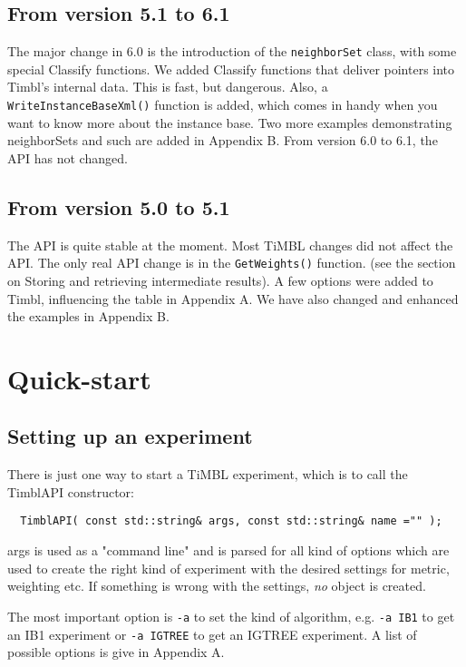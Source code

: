 \documentclass{report}
\begin{document}
\section{From version 5.1 to 6.1}

The major change in 6.0 is the introduction of the {\tt neighborSet}
class, with some special Classify functions.  We added Classify
functions that deliver pointers into Timbl's internal data. This is
fast, but dangerous.  Also, a {\tt WriteInstanceBaseXml()} function is
added, which comes in handy when you want to know more about the
instance base.  Two more examples demonstrating neighborSets and such
are added in Appendix B. From version 6.0 to 6.1, the API has not changed.

\section{From version 5.0 to 5.1}

The API is quite stable at the moment. Most TiMBL changes did not
affect the API. The only real API change is in the {\tt GetWeights()}
function. (see the section on Storing and retrieving intermediate
results).  A few options were added to Timbl, influencing the table in
Appendix A. We have also changed and enhanced the examples in Appendix
B.

\chapter{Quick-start}
\section{Setting up an experiment}

There is just one way to start a TiMBL experiment, which is to call
the TimblAPI constructor:

\begin{footnotesize}
\begin{verbatim}
  TimblAPI( const std::string& args, const std::string& name ="" );
\end{verbatim}
\end{footnotesize}

args is used as a "command line" and is parsed for all kind of options
which are used to create the right kind of experiment with the desired
settings for metric, weighting etc. If something is wrong with the
settings, {\em no}\/ object is created.

The most important option is {\tt -a}  to set the kind of algorithm,
e.g. {\tt -a IB1} to get an IB1 experiment or {\tt -a IGTREE} to get an IGTREE
experiment. A list of possible options is give in Appendix A.
\end{document}
